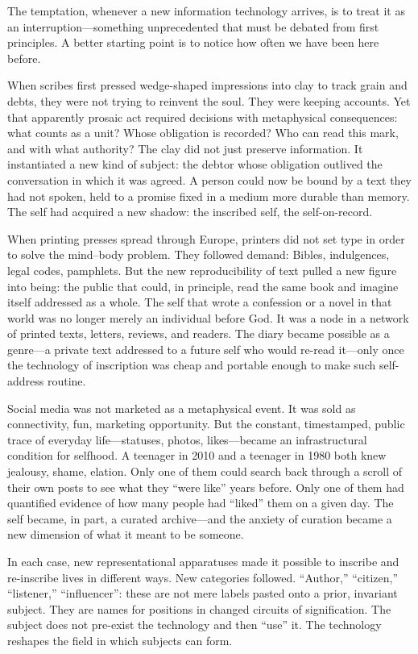 \documentclass[12pt,a4paper]{report}
\begin{document}
The temptation, whenever a new information technology arrives, is to treat it as an interruption---something unprecedented that must be debated from first principles. A better starting point is to notice how often we have been here before.

When scribes first pressed wedge-shaped impressions into clay to track grain and debts, they were not trying to reinvent the soul. They were keeping accounts. Yet that apparently prosaic act required decisions with metaphysical consequences: what counts as a unit? Whose obligation is recorded? Who can read this mark, and with what authority? The clay did not just preserve information. It instantiated a new kind of subject: the debtor whose obligation outlived the conversation in which it was agreed. A person could now be bound by a text they had not spoken, held to a promise fixed in a medium more durable than memory. The self had acquired a new shadow: the inscribed self, the self-on-record.

When printing presses spread through Europe, printers did not set type in order to solve the mind--body problem. They followed demand: Bibles, indulgences, legal codes, pamphlets. But the new reproducibility of text pulled a new figure into being: the public that could, in principle, read the same book and imagine itself addressed as a whole. The self that wrote a confession or a novel in that world was no longer merely an individual before God. It was a node in a network of printed texts, letters, reviews, and readers. The diary became possible as a genre---a private text addressed to a future self who would re-read it---only once the technology of inscription was cheap and portable enough to make such self-address routine.

Social media was not marketed as a metaphysical event. It was sold as connectivity, fun, marketing opportunity. But the constant, timestamped, public trace of everyday life---statuses, photos, likes---became an infrastructural condition for selfhood. A teenager in 2010 and a teenager in 1980 both knew jealousy, shame, elation. Only one of them could search back through a scroll of their own posts to see what they ``were like'' years before. Only one of them had quantified evidence of how many people had ``liked'' them on a given day. The self became, in part, a curated archive---and the anxiety of curation became a new dimension of what it meant to be someone.

In each case, new representational apparatuses made it possible to inscribe and re-inscribe lives in different ways. New categories followed. ``Author,'' ``citizen,'' ``listener,'' ``influencer'': these are not mere labels pasted onto a prior, invariant subject. They are names for positions in changed circuits of signification. The subject does not pre-exist the technology and then ``use'' it. The technology reshapes the field in which subjects can form.
\end{document}
